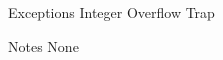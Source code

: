 \begin{iPageDescEntry}{Exceptions}
Integer Overflow Trap
\end{iPageDescEntry}

\begin{iPageDescEntry}{Notes}
None
\end{iPageDescEntry}







